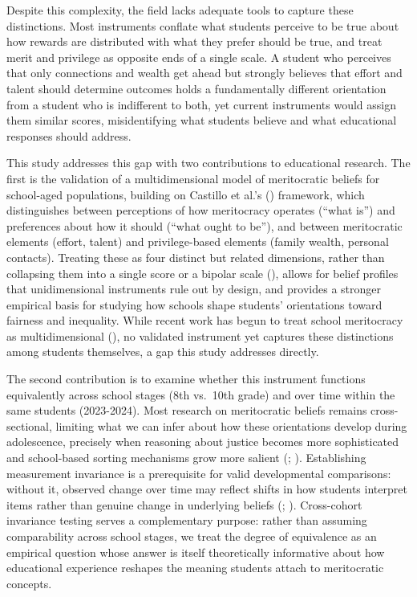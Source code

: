 \documentclass[
  13pt,
]{article}
\begin{document}
Despite this complexity, the field lacks adequate tools to capture these
distinctions. Most instruments conflate what students perceive to be
true about how rewards are distributed with what they prefer should be
true, and treat merit and privilege as opposite ends of a single scale.
A student who perceives that only connections and wealth get ahead but
strongly believes that effort and talent should determine outcomes holds
a fundamentally different orientation from a student who is indifferent
to both, yet current instruments would assign them similar scores,
misidentifying what students believe and what educational responses
should address.

This study addresses this gap with two contributions to educational
research. The first is the validation of a multidimensional model of
meritocratic beliefs for school-aged populations, building on Castillo
et al.'s ()
framework, which distinguishes between perceptions of how meritocracy
operates (``what is'') and preferences about how it should (``what ought
to be''), and between meritocratic elements (effort, talent) and
privilege-based elements (family wealth, personal contacts). Treating
these as four distinct but related dimensions, rather than collapsing
them into a single score or a bipolar scale
(),
allows for belief profiles that unidimensional instruments rule out by
design, and provides a stronger empirical basis for studying how schools
shape students' orientations toward fairness and inequality. While
recent work has begun to treat school meritocracy as multidimensional
(), no validated
instrument yet captures these distinctions among students themselves, a
gap this study addresses directly.

The second contribution is to examine whether this instrument functions
equivalently across school stages (8th vs.~10th grade) and over time
within the same students (2023-2024). Most research on meritocratic
beliefs remains cross-sectional, limiting what we can infer about how
these orientations develop during adolescence, precisely when reasoning
about justice becomes more sophisticated and school-based sorting
mechanisms grow more salient
(;
). Establishing
measurement invariance is a prerequisite for valid developmental
comparisons: without it, observed change over time may reflect shifts in
how students interpret items rather than genuine change in underlying
beliefs (; ). Cross-cohort invariance testing serves a complementary purpose:
rather than assuming comparability across school stages, we treat the
degree of equivalence as an empirical question whose answer is itself
theoretically informative about how educational experience reshapes the
meaning students attach to meritocratic concepts.
\end{document}
